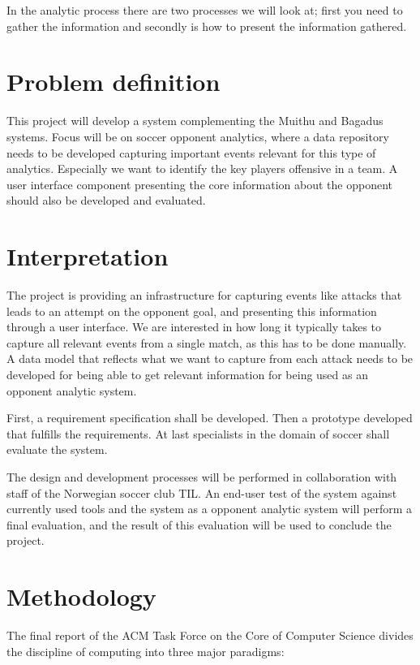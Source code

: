 In the analytic process there are two processes we will look at; first you need to gather the information and secondly is how to present the information gathered. 

\section{Problem definition}

This project will develop a system complementing the Muithu and Bagadus systems. Focus will be on soccer opponent analytics, where a data repository needs to be developed capturing important events relevant for this type of analytics. Especially we want to identify the key players offensive in a team. A user interface component presenting the core information about the opponent should also be developed and evaluated.

\section{Interpretation}

The project is providing an infrastructure for capturing events like attacks that leads to an attempt on the opponent goal, and presenting this information through a user interface. We are interested in how long it typically takes to capture all relevant events from a single match, as this has to be done manually. A data model that reflects what we want to capture from each attack needs to be developed for being able to get relevant information for being used as an opponent analytic system.

First, a requirement specification shall be developed. Then a prototype developed that fulfills the requirements. At last specialists in the domain of soccer shall evaluate the system.

The design and development processes will be performed in collaboration with staff of the Norwegian soccer club \ac{TIL}. An end-user test of the system against currently used tools and the system as a opponent analytic system will perform a final evaluation, and the result of this evaluation will be used to conclude the project.

\section{Methodology}

The final report of the ACM Task Force on the Core of Computer Science \cite{computing_as_a_discipline} divides the discipline of computing into three major paradigms:

